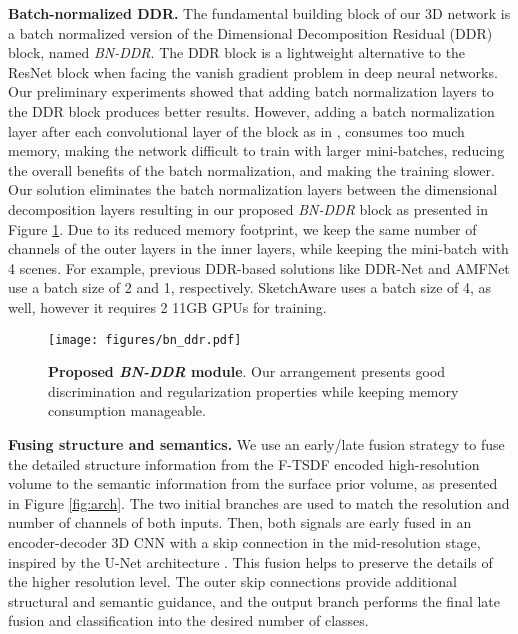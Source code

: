 \textbf{Batch-normalized DDR.} The fundamental building block of our 3D network is a batch normalized version of the Dimensional Decomposition Residual (DDR) \cite{Li_2019_CVPR} block, named \emph{BN-DDR}. The DDR block is a lightweight alternative to the ResNet block \cite{ResNet} when facing the vanish gradient problem in deep neural networks. Our preliminary experiments showed that adding batch normalization layers to the DDR block produces better results. However, adding a batch normalization layer after each convolutional layer of the block as in \cite{attention_2020}, consumes too much memory, making the network difficult to train with larger mini-batches, reducing the overall benefits of the batch normalization, and making the training slower. Our solution eliminates the batch normalization layers between the dimensional decomposition layers resulting in our proposed  \emph{BN-DDR} block as presented in Figure \ref{fig:BN-DDR}. Due to its reduced memory footprint, we keep the same number of channels of the outer layers in the inner layers, 
while keeping the mini-batch with 4 scenes. For example, previous DDR-based solutions like DDR-Net \cite{Li_2019_CVPR} and AMFNet \cite{attention_2020} use a batch size of 2 and 1, respectively. SketchAware \cite{Sketch} uses a batch size of 4, as well, however it requires 2 11GB GPUs for training.



\begin{figure}[t]
\centering
\texttt{[image: figures/bn\_ddr.pdf]}
\caption{\textbf{Proposed \emph{BN-DDR} module}. Our arrangement presents good discrimination and regularization properties while keeping memory consumption manageable.}
\label{fig:BN-DDR}
\end{figure}

\textbf{Fusing structure and semantics.} We use an early/late fusion strategy to fuse the detailed structure information from the F-TSDF encoded high-resolution volume to the semantic information from the surface prior volume, as presented in Figure \ref{fig:arch}. The two initial branches are used to match the resolution and number of channels of both inputs. Then, both signals are early fused in an encoder-decoder 3D CNN with a skip connection in the mid-resolution stage, inspired by the U-Net architecture \cite{unet_2015}. This fusion helps to preserve the details of the higher resolution level. The outer skip connections provide additional structural and semantic guidance, and the output branch performs the final late fusion and classification into the desired number of classes.


